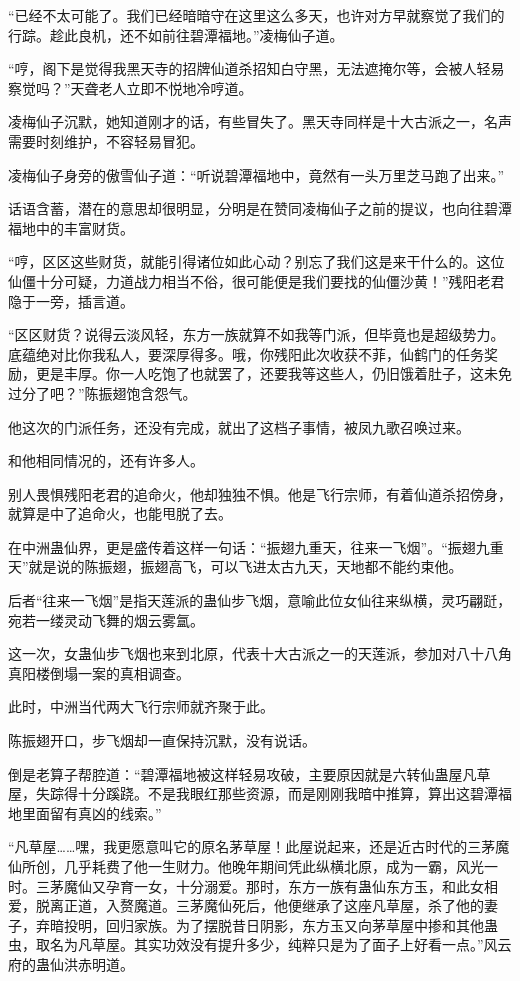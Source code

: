 \begin{this_body}
“已经不太可能了。我们已经暗暗守在这里这么多天，也许对方早就察觉了我们的行踪。趁此良机，还不如前往碧潭福地。”凌梅仙子道。

“哼，阁下是觉得我黑天寺的招牌仙道杀招知白守黑，无法遮掩尔等，会被人轻易察觉吗？”天聋老人立即不悦地冷哼道。

凌梅仙子沉默，她知道刚才的话，有些冒失了。黑天寺同样是十大古派之一，名声需要时刻维护，不容轻易冒犯。

凌梅仙子身旁的傲雪仙子道：“听说碧潭福地中，竟然有一头万里芝马跑了出来。”

话语含蓄，潜在的意思却很明显，分明是在赞同凌梅仙子之前的提议，也向往碧潭福地中的丰富财货。

“哼，区区这些财货，就能引得诸位如此心动？别忘了我们这是来干什么的。这位仙僵十分可疑，力道战力相当不俗，很可能便是我们要找的仙僵沙黄！”残阳老君隐于一旁，插言道。

“区区财货？说得云淡风轻，东方一族就算不如我等门派，但毕竟也是超级势力。底蕴绝对比你我私人，要深厚得多。哦，你残阳此次收获不菲，仙鹤门的任务奖励，更是丰厚。你一人吃饱了也就罢了，还要我等这些人，仍旧饿着肚子，这未免过分了吧？”陈振翅饱含怨气。

他这次的门派任务，还没有完成，就出了这档子事情，被凤九歌召唤过来。

和他相同情况的，还有许多人。

别人畏惧残阳老君的追命火，他却独独不惧。他是飞行宗师，有着仙道杀招傍身，就算是中了追命火，也能甩脱了去。

在中洲蛊仙界，更是盛传着这样一句话：“振翅九重天，往来一飞烟”。“振翅九重天”就是说的陈振翅，振翅高飞，可以飞进太古九天，天地都不能约束他。

后者“往来一飞烟”是指天莲派的蛊仙步飞烟，意喻此位女仙往来纵横，灵巧翩跹，宛若一缕灵动飞舞的烟云雾氲。

这一次，女蛊仙步飞烟也来到北原，代表十大古派之一的天莲派，参加对八十八角真阳楼倒塌一案的真相调查。

此时，中洲当代两大飞行宗师就齐聚于此。

陈振翅开口，步飞烟却一直保持沉默，没有说话。

倒是老算子帮腔道：“碧潭福地被这样轻易攻破，主要原因就是六转仙蛊屋凡草屋，失踪得十分蹊跷。不是我眼红那些资源，而是刚刚我暗中推算，算出这碧潭福地里面留有真凶的线索。”

“凡草屋……嘿，我更愿意叫它的原名茅草屋！此屋说起来，还是近古时代的三茅魔仙所创，几乎耗费了他一生财力。他晚年期间凭此纵横北原，成为一霸，风光一时。三茅魔仙又孕育一女，十分溺爱。那时，东方一族有蛊仙东方玉，和此女相爱，脱离正道，入赘魔道。三茅魔仙死后，他便继承了这座凡草屋，杀了他的妻子，弃暗投明，回归家族。为了摆脱昔日阴影，东方玉又向茅草屋中掺和其他蛊虫，取名为凡草屋。其实功效没有提升多少，纯粹只是为了面子上好看一点。”风云府的蛊仙洪赤明道。


\end{this_body}
